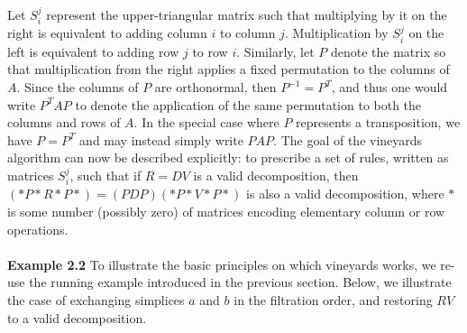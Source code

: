 \documentclass{siamart190516}
\newcommand\topstrut[1][1.1ex]{\setlength\bigstrutjot{#1}{\bigstrut[t]}}
\newcommand\botstrut[1][0.95ex]{\setlength\bigstrutjot{#1}{\bigstrut[b]}}
\begin{document}
Let $S_{i}^j$ represent the upper-triangular matrix such that multiplying by it on the right is equivalent to adding column $i$ to column $j$. 
Multiplication by $S_{i}^j$ on the left is equivalent to adding row $j$ to row $i$.
Similarly, let $P$ denote the matrix so that multiplication from the right applies a fixed permutation to the columns of $A$.
Since the columns of $P$ are orthonormal, then  $P^{-1} = P^T$, and thus one would write $P^T A P$ to denote the application of the same permutation  to both the columns and rows of $A$. In the special case where $P$ represents a transposition, we have $P = P^T$ and may instead simply write $P A P$. 
The goal of the vineyards algorithm can now be described explicitly: to prescribe a set of rules, written as matrices $S_{i}^{j}$, such that if $R = D V$ is a valid decomposition, then $(\ast P \ast R \ast P \ast) = (PDP)(\ast P\ast V \ast P \ast)$ is also a valid decomposition, where $\ast$ is some number (possibly zero) of matrices encoding elementary column or row operations. 
\\
\\
\noindent 
\textbf{Example 2.2} To illustrate the basic principles on which vineyards works, we re-use the running example introduced in the previous section. Below, we illustrate the case of exchanging simplices $a$ and $b$ in the filtration order, and restoring $RV$ to a valid decomposition. 
\end{document}
